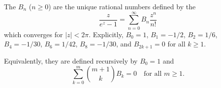 \begin{definition} \label{definition:bernoulli_numbers}
The  $B_n$ ($n \geq 0$) are the unique rational numbers defined by the 
$$
\boxed{\frac{z}{e^z - 1} = \sum_{n=0}^\infty B_n \frac{z^n}{n!}}
$$
which converges for $|z| < 2\pi$. Explicitly, $B_0 = 1$, $B_1 = -1/2$, $B_2 = 1/6$, $B_4 = -1/30$, $B_6 = 1/42$, $B_8 = -1/30$, and $B_{2k+1} = 0$ for all $k \geq 1$.

Equivalently, they are defined recursively by $B_0 = 1$ and
$$
\sum_{k=0}^m \binom{m+1}{k} B_k = 0 \quad \text{for all } m \geq 1.
$$


\end{definition}